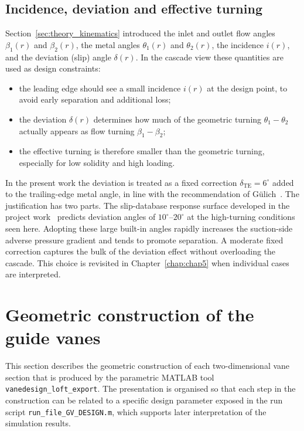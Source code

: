 \subsection{Incidence, deviation and effective turning}
\label{sec:theory_incidence_deviation}
 
Section~\ref{sec:theory_kinematics} introduced the inlet and outlet flow angles $\beta_1(r)$ and $\beta_2(r)$, the metal angles $\theta_1(r)$ and $\theta_2(r)$, the incidence $i(r)$, and the deviation (slip) angle $\delta(r)$. In the cascade view these quantities are used as design constraints:
\begin{itemize}
  \item the leading edge should see a small incidence $i(r)$ at the design point, to avoid early separation and additional loss;
  \item the deviation $\delta(r)$ determines how much of the geometric turning $\theta_1 - \theta_2$ actually appears as flow turning $\beta_1 - \beta_2$;
  \item the effective turning is therefore smaller than the geometric turning, especially for low solidity and high loading.
\end{itemize}
In the present work the deviation is treated as a fixed correction $\delta_{\mathrm{TE}} = 6^\circ$ added to the trailing-edge metal angle, in line with the recommendation of G\"ulich~\cite{Gulich2010}. The justification has two parts. The slip-database response surface developed in the project work~\cite{Leonsen2025} predicts deviation angles of $10^\circ$--$20^\circ$ at the high-turning conditions seen here. Adopting these large built-in angles rapidly increases the suction-side adverse pressure gradient and tends to promote separation. A moderate fixed correction captures the bulk of the deviation effect without overloading the cascade. This choice is revisited in Chapter~\ref{chap:chap5} when individual cases are interpreted.
 
\section{Geometric construction of the guide vanes}
\label{sec:theory_geometric_construction}
 
This section describes the geometric construction of each two-dimensional vane section that is produced by the parametric MATLAB tool \texttt{vanedesign\_loft\_export}. The presentation is organised so that each step in the construction can be related to a specific design parameter exposed in the run script \texttt{run\_file\_GV\_DESIGN.m}, which supports later interpretation of the simulation results.
 
